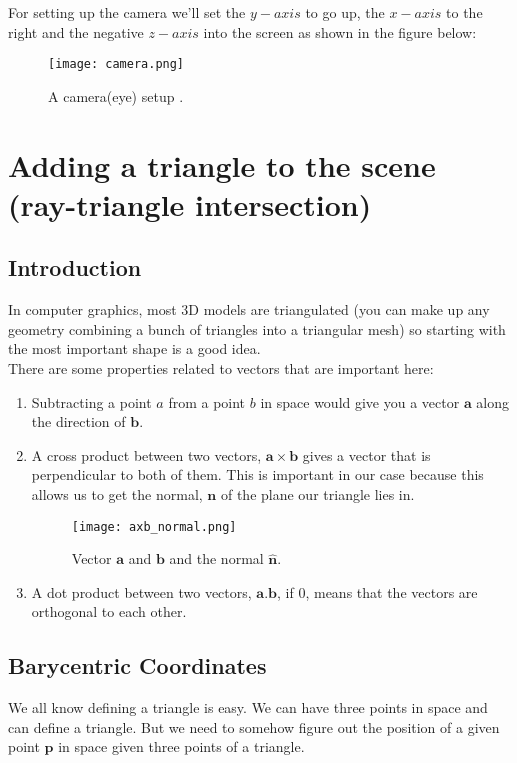 \documentclass[11pt,a4paper]{article}
\begin{document}
	\noindent
	For setting up the camera we'll set the $y-axis$ to go up, the $x-axis$ to the right and the negative $z-axis$ into the screen as shown in the figure below:
	\begin{figure}[H]
		\centering
		\texttt{[image: camera.png]}
		\caption{\centering A camera(eye) setup \protect\cite{Shirley2020RTW1}.}
	\end{figure}
	
	\section{Adding a triangle to the scene (ray-triangle intersection)}
	\subsection{Introduction}
	In computer graphics, most 3D models are triangulated (you can make up any geometry combining a bunch of triangles into a triangular mesh) so starting with the most important shape is a good idea.\\
	
	There are some properties related to vectors that are important here:
	\begin{enumerate}
		\item Subtracting a point $a$ from a point $b$ in space would give you a vector $\boldsymbol{a}$ along the direction of $\boldsymbol{b}$.
		\item A cross product between two vectors, $\boldsymbol{a} \times \boldsymbol{b}$  gives a vector that is perpendicular to both of them. This is important in our case because this allows us to get the normal, $\boldsymbol{n}$ of the plane our triangle lies in.
		\begin{figure}[H]
			\centering
			\texttt{[image: axb\_normal.png]}
			\caption{\centering Vector $\boldsymbol{a}$ and $\boldsymbol{b}$ and the normal $\boldsymbol{\hat{n}}$.}
		\end{figure}
		\item A dot product between two vectors, $\boldsymbol{a}.\boldsymbol{b}$, if $0$, means that the vectors are orthogonal to each other.
	\end{enumerate}	
	
	\subsection{Barycentric Coordinates}
	We all know defining a triangle is easy. We can have three points in space and can define a triangle. But we need to somehow figure out the position of a given point $\boldsymbol{p}$ in space given three points of a triangle.
	
\end{document}
